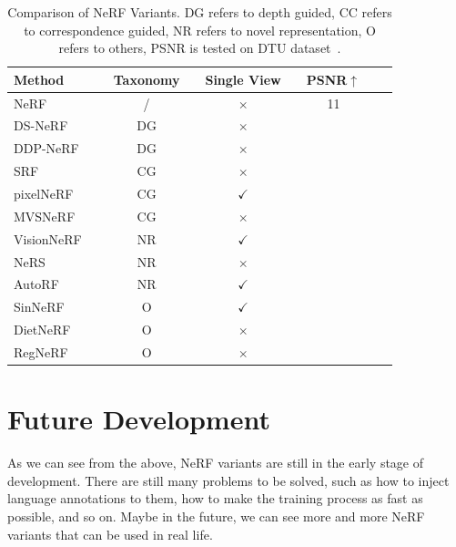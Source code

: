 \documentclass[10pt,twocolumn,letterpaper]{article}
\begin{document}
\begin{table}[t]
   \centering
   \begin{tabular}{@{}lc@{}c@{}lc@{}lc@{}lc}
     \hline
     Method && Taxonomy && Single View && PSNR$\uparrow$\\
     \hline
     NeRF~\cite{mildenhall2020nerf} && / && $\times$ && 11\\
     DS-NeRF~\cite{kangle2021dsnerf} && DG && $\times$ && \\
     DDP-NeRF~\cite{Roessle_2022_CVPR} && DG && $\times$ && \\
     SRF~\cite{SRF} && CG && $\times$ &&\\
     pixelNeRF~\cite{yu2020pixelnerf} && CG && $\checkmark$ &&\\
     MVSNeRF~\cite{mvsnerf} && CG && $\times$ &&\\
     VisionNeRF~\cite{lin2023visionnerf} && NR && $\checkmark$ &&\\
     NeRS~\cite{zhang2021ners} && NR && $\times$ &&\\
     AutoRF~\cite{mueller2022autorf} && NR && $\checkmark$ &&\\
     SinNeRF~\cite{Xu_2022_SinNeRF} && O && $\checkmark$ &&\\
     DietNeRF~\cite{Jain_2021_ICCV} && O && $\times$ &&\\
     RegNeRF~\cite{Niemeyer2021Regnerf} && O && $\times$ &&\\
     \hline
   \end{tabular}
   \vspace{2mm}
   \caption{Comparison of NeRF Variants. DG refers to depth guided, CC refers to correspondence guided, NR refers to novel representation, O refers to others, PSNR is tested on DTU dataset~\cite{6909453}.}
   \label{tab:relation}
   \vspace{-2mm}
\end{table}

\section{Future Development}

As we can see from the above, NeRF variants are still in the early stage of development. There are still many problems to be solved, such as how to inject language annotations to them, how to make the training process as fast as possible, and so on. Maybe in the future, we can see more and more NeRF variants that can be used in real life.

\newpage
{\small


}
\end{document}
